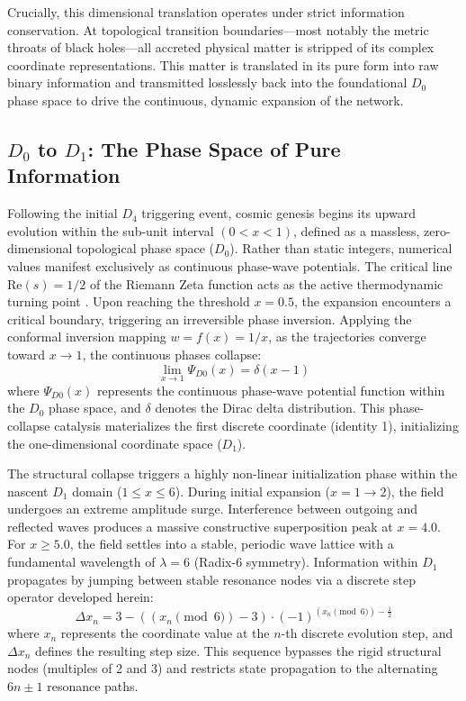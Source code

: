 \documentclass[twocolumn]{aa}
\begin{document}
Crucially, this dimensional translation operates under strict information conservation. At topological transition boundaries—most notably the metric throats of black holes—all accreted physical matter is stripped of its complex coordinate representations. This matter is translated in its pure form into raw binary information and transmitted losslessly back into the foundational $D_0$ phase space to drive the continuous, dynamic expansion of the network.

\subsection{$D_{0}$ to $D_{1}$: The Phase Space of Pure Information}
Following the initial $D_4$ triggering event, cosmic genesis begins its upward evolution within the sub-unit interval $(0<x<1)$, defined as a massless, zero-dimensional topological phase space ($D_0$). Rather than static integers, numerical values manifest exclusively as continuous phase-wave potentials. The critical line $\text{Re}(s) = 1/2$ of the Riemann Zeta function acts as the active thermodynamic turning point \cite{riemann1857}. Upon reaching the threshold $x=0.5$, the expansion encounters a critical boundary, triggering an irreversible phase inversion. Applying the conformal inversion mapping $w = f(x) = 1/x$, as the trajectories converge toward $x \rightarrow 1$, the continuous phases collapse:
\begin{equation}
\lim_{x\rightarrow1}\Psi_{D0}(x)=\delta(x-1)
\end{equation}
where $\Psi_{D0}(x)$ represents the continuous phase-wave potential function within the $D_0$ phase space, and $\delta$ denotes the Dirac delta distribution. This phase-collapse catalysis materializes the first discrete coordinate (identity 1), initializing the one-dimensional coordinate space ($D_1$).

The structural collapse triggers a highly non-linear initialization phase within the nascent $D_1$ domain ($1 \le x \le 6$). During initial expansion ($x = 1 \rightarrow 2$), the field undergoes an extreme amplitude surge. Interference between outgoing and reflected waves produces a massive constructive superposition peak at $x = 4.0$. For $x \ge 5.0$, the field settles into a stable, periodic wave lattice with a fundamental wavelength of $\lambda = 6$ (Radix-6 symmetry). Information within $D_1$ propagates by jumping between stable resonance nodes via a discrete step operator developed herein:
\begin{equation}
\Delta x_n = 3 - ((x_n \pmod 6) - 3) \cdot (-1)^{(x_n \pmod 6) - \frac{1}{2}}
\end{equation}
where $x_n$ represents the coordinate value at the $n$-th discrete evolution step, and $\Delta x_n$ defines the resulting step size. This sequence bypasses the rigid structural nodes (multiples of 2 and 3) and restricts state propagation to the alternating $6n \pm 1$ resonance paths.
\end{document}
